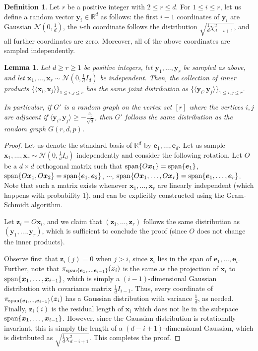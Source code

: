 \documentclass[11pt]{amsart}
\newtheorem{lemma}[theorem]{\bf Lemma}
\theoremstyle{definition}
\newtheorem{definition}[theorem]{\bf Definition}
\def\cN{\mathcal{N}}
\def\bR{\mathbb{R}}
\def\be{\boldsymbol{e}}
\def\bx{\boldsymbol{x}}
\def\by{\boldsymbol{y}}
\def\bz{\boldsymbol{z}}
\begin{document}
\begin{definition}
Let $r$ be a positive integer with $2\leq r\leq d$. For $1\leq i\leq r$, let us define a random vector $\by_i\in \bR^d$ as follows: the first $i-1$ coordinates of $\by_i$ are Gaussian $\cN(0, \frac{1}{d})$, the $i$-th coordinate follows the distribution $\sqrt{\frac{1}{d}\chi_{d-i+1}^2}$, and all further coordinates are zero. Moreover, all of the above coordinates are sampled independently.
\end{definition}

\begin{lemma}
Let $d\geq r\geq 1$ be positive integers, let $\by_1, \dots, \by_r$ be sampled as above, and let $\bx_1, \dots, \bx_r\sim \cN(0, \frac{1}{d}I_d)$ be independent. Then, the collection of inner products $\big\{\langle \bx_i, \bx_j\rangle\big\}_{1\leq i, j\leq r}$ has the same joint distribution as $\big\{\langle \by_i, \by_j\rangle\big\}_{1\leq i, j\leq r}$.

In particular, if $G'$ is a random graph on the vertex set $[r]$ where the vertices $i,j$ are adjacent if $\langle \by_i, \by_j\rangle\geq -\frac{c_p}{\sqrt{d}}$, then $G'$ follows the same distribution as the random graph $G(r, d, p)$.
\end{lemma}
\begin{proof}
Let us denote the standard basis of $\bR^d$ by $\be_1, \dots, \be_d$. Let us sample $\bx_1, \dots, \bx_r\sim \cN(0, \frac{1}{d}I_d)$ independently and consider the following rotation. Let $O$ be a $d\times d$ orthogonal matrix such that ${\rm span}\{O\bx_1\}={\rm span}\{\be_1\}$, ${\rm span}\{O\bx_1, O\bx_2\}={\rm span}\{\be_1, \be_2\}$, $\cdots$, ${\rm span}\{O\bx_1, \dots, O\bx_r\}={\rm span}\{\be_1, \dots, \be_r\}$. Note that such a matrix exists whenever $\bx_1, \dots, \bx_r$ are linearly independent (which happens with probability $1$), and can be explicitly constructed using the Gram-Schmidt algorithm.

Let $\bz_i=O\bx_i$, and we claim that $(\bz_1, \dots, \bz_r)$ follows the same distribution as $(\by_1, \dots, \by_r)$, which is sufficient to conclude the proof (since $O$ does not change the inner products).

Observe first that $\bz_i(j)=0$ when $j>i$, since $\bz_i$ lies in the span of $\be_1, \dots, \be_i$. Further, note that $\pi_{{\rm span}\{\be_1, \dots, \be_{i-1}\}}(\bz_i)$ is the same as the projection of $\bx_i$ to ${\rm span}\{\bx_1, \dots, \bx_{i-1}\}$, which is simply a $(i-1)$-dimensional Gaussian distribution with covariance matrix $\frac{1}{d}I_{i-1}$. Thus, every coordinate of $\pi_{{\rm span}\{\be_1, \dots, \be_{i-1}\}}(\bz_i)$ has a Gaussian distribution with variance $\frac{1}{d}$, as needed. Finally, $\bz_i(i)$ is the residual length of $\bx_i$ which does not lie in the subspace ${\rm span} \{\bx_1, \dots, \bx_{i-1}\}$. However, since the Gaussian distribution is rotationally invariant, this is simply the length of a $(d-i+1)$-dimensional Gaussian, which is distributed as $\sqrt{\frac{1}{d}\chi_{d-i+1}^2}$. This completes the proof.
\end{proof}
\end{document}
